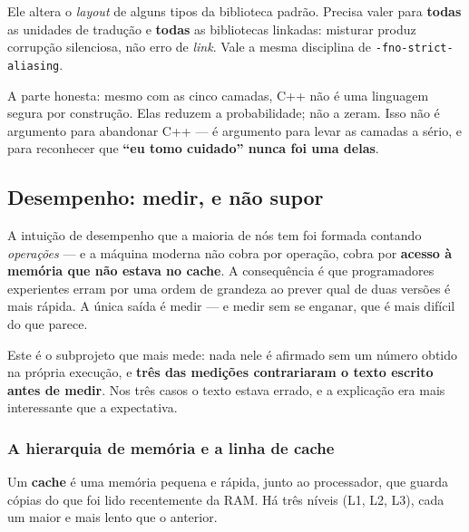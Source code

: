 \begin{armadilha}
Ele altera o \emph{layout} de alguns tipos da biblioteca padrão. Precisa valer
para \textbf{todas} as unidades de tradução e \textbf{todas} as bibliotecas
linkadas: misturar produz corrupção silenciosa, não erro de \emph{link}. Vale a
mesma disciplina de \texttt{-fno-strict-aliasing}.
\end{armadilha}

\begin{aviso}
A parte honesta: mesmo com as cinco camadas, C++ não é uma linguagem segura por
construção. Elas reduzem a probabilidade; não a zeram. Isso não é argumento para
abandonar C++ --- é argumento para levar as camadas a sério, e para reconhecer que
\textbf{``eu tomo cuidado'' nunca foi uma delas}.
\end{aviso}

\subsection{Desempenho: medir, e não supor}
\label{sec:desempenho}

\begin{porque}
A intuição de desempenho que a maioria de nós tem foi formada contando
\emph{operações} --- e a máquina moderna não cobra por operação, cobra por
\textbf{acesso à memória que não estava no cache}. A consequência é que
programadores experientes erram por uma ordem de grandeza ao prever qual de duas
versões é mais rápida. A única saída é medir --- e medir sem se enganar, que é
mais difícil do que parece.
\end{porque}

Este é o subprojeto que mais mede: nada nele é afirmado sem um número obtido na
própria execução, e \textbf{três das medições contrariaram o texto escrito antes
de medir}. Nos três casos o texto estava errado, e a explicação era mais
interessante que a expectativa.

\subsubsection{A hierarquia de memória e a linha de cache}

Um \textbf{cache} é uma memória pequena e rápida, junto ao processador, que guarda
cópias do que foi lido recentemente da RAM. Há três níveis (L1, L2, L3), cada um
maior e mais lento que o anterior.

